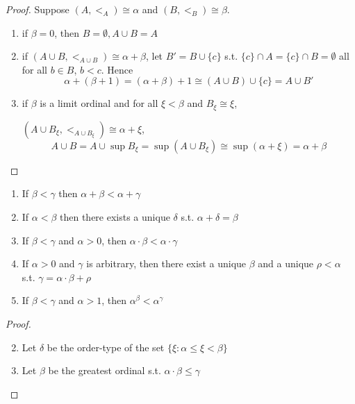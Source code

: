 \documentclass[11pt]{article}
\begin{document}
\begin{proof}
Suppose \((A,<_A)\cong\alpha\) and \((B,<_B)\cong\beta\). 
\begin{enumerate}
\item if \(\beta=0\), then \(B=\emptyset, A\cup B=A\)
\item if \((A\cup B,<_{A\cup B})\cong \alpha+\beta\), let \(B'\equal B\cup\{c\}\) s.t.
\(\{c\}\cap A=\{c\}\cap B=\emptyset\) all for all \(b\in B\), \(b<c\). Hence
\begin{equation*}
\alpha+(\beta+1)=(\alpha+\beta)+1\cong(A\cup B)\cup\{c\}=A\cup B'
\end{equation*}

\item if \(\beta\) is a limit ordinal and for all \(\xi<\beta\) and \(B_\xi\cong\xi\),\par
\((A\cup B_\xi,<_{A\cup B_\xi})\cong\alpha+\xi\),
\begin{equation*}
A\cup B=A\cup\sup{B_\xi}=\sup(A\cup B_\xi)\cong\sup(\alpha+\xi)=\alpha+\beta
\end{equation*}
\end{enumerate}
\end{proof}

\begin{lemma}[]
\begin{enumerate}
\item If \(\beta<\gamma\) then \(\alpha+\beta<\alpha+\gamma\)
\item If \(\alpha<\beta\) then there exists a unique \(\delta\) s.t.
\(\alpha+\delta=\beta\)
\item If \(\beta < \gamma\) and \(\alpha>0\), then
\(\alpha\cdot\beta<\alpha\cdot\gamma\)
\item If \(\alpha>0\) and \(\gamma\) is arbitrary, then there exist a unique \(\beta\) and
a unique \(\rho<\alpha\) s.t. \(\gamma=\alpha\cdot\beta+\rho\)
\item If \(\beta<\gamma\) and \(\alpha>1\), then \(\alpha^\beta<\alpha^\gamma\)
\end{enumerate}
\end{lemma}
\begin{proof}
\begin{enumerate}
\setcounter{enumi}{1}
\item Let \(\delta\) be the order-type of the set \(\{\xi:\alpha\le\xi<\beta\}\)
\setcounter{enumi}{3}
\item Let \(\beta\) be the greatest ordinal s.t. \(\alpha\cdot\beta\le\gamma\)
\end{enumerate}
\end{proof}
\end{document}
